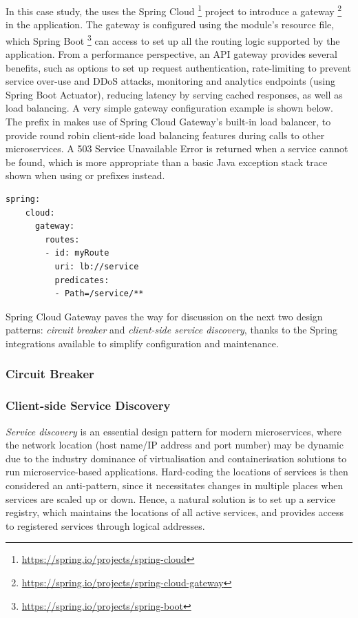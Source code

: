 In this case study, the  uses the Spring Cloud \footnote{\url{https://spring.io/projects/spring-cloud}} project to introduce a gateway \footnote{\url{https://spring.io/projects/spring-cloud-gateway}} in the application. The gateway is configured using the module's  resource file, which Spring Boot \footnote{\url{https://spring.io/projects/spring-boot}} can access to set up all the routing logic supported by the application. From a performance perspective, an API gateway provides several benefits, such as options to set up request authentication, rate-limiting to prevent service over-use and DDoS attacks, monitoring and analytics endpoints (using Spring Boot Actuator), reducing latency by serving cached responses, as well as load balancing. A very simple gateway configuration example is shown below. The  prefix in  makes use of Spring Cloud Gateway's built-in load balancer, to provide round robin client-side load balancing features during calls to other microservices. A 503 Service Unavailable Error is returned when a service cannot be found, which is more appropriate than a basic Java exception stack trace shown when using  or  prefixes instead.

\begin{lstlisting}[caption=Sample Spring Cloud Gateway configuration]
  spring:
    cloud:
      gateway:
        routes:
        - id: myRoute
          uri: lb://service
          predicates:
          - Path=/service/**
\end{lstlisting}

Spring Cloud Gateway paves the way for discussion on the next two design patterns: \textit{circuit breaker} and \textit{client-side service discovery}, thanks to the Spring integrations available to simplify configuration and maintenance.


\subsubsection{Circuit Breaker}

\subsubsection{Client-side Service Discovery}

\textit{Service discovery} is an essential design pattern for modern microservices, where the network location (host name/IP address and port number) may be dynamic due to the industry dominance of virtualisation and containerisation solutions to run microservice-based applications. Hard-coding the locations of services is then considered an anti-pattern, since it necessitates changes in multiple places when services are scaled up or down. Hence, a natural solution is to set up a service registry, which maintains the locations of all active services, and provides access to registered services through logical addresses. 

